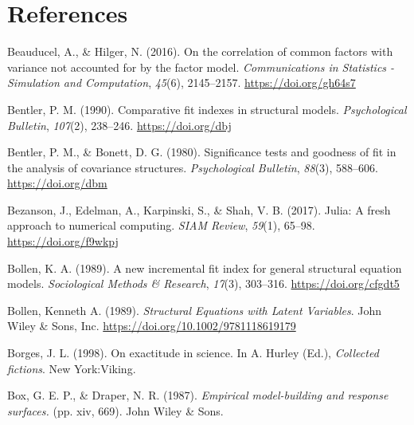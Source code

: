 \documentclass[11pt]{umnthesis}
\newlength{\cslhangindent}
\newenvironment{CSLReferences}[2] %
 {%
  \setlength{\parindent}{0pt}
  \ifodd #1 \everypar{\setlength{\hangindent}{\cslhangindent}}\ignorespaces\fi
  \ifnum #2 > 0
  \setlength{\parskip}{#2\baselineskip}
  \fi
 }%
 {}
\begin{document}
\hypertarget{references}{%
\chapter*{References}\label{references}}

\noindent

\setlength{\parindent}{-0.20in}
\setlength{\leftskip}{0.20in}
\setlength{\parskip}{8pt}

\hypertarget{refs}{}
\begin{CSLReferences}{1}{0}
\leavevmode{}%
Beauducel, A., \& Hilger, N. (2016). On the correlation of common factors with variance not accounted for by the factor model. \emph{Communications in Statistics - Simulation and Computation}, \emph{45}(6), 2145--2157. \url{https://doi.org/gh64s7}

\leavevmode{}%
Bentler, P. M. (1990). Comparative fit indexes in structural models. \emph{Psychological Bulletin}, \emph{107}(2), 238--246. \url{https://doi.org/dbj}

\leavevmode{}%
Bentler, P. M., \& Bonett, D. G. (1980). Significance tests and goodness of fit in the analysis of covariance structures. \emph{Psychological Bulletin}, \emph{88}(3), 588--606. \url{https://doi.org/dbm}

\leavevmode{}%
Bezanson, J., Edelman, A., Karpinski, S., \& Shah, V. B. (2017). Julia: {A} fresh approach to numerical computing. \emph{SIAM Review}, \emph{59}(1), 65--98. \url{https://doi.org/f9wkpj}

\leavevmode{}%
Bollen, K. A. (1989). A new incremental fit index for general structural equation models. \emph{Sociological Methods \& Research}, \emph{17}(3), 303--316. \url{https://doi.org/cfgdt5}

\leavevmode{}%
Bollen, Kenneth A. (1989). \emph{Structural {Equations} with {Latent Variables}}. {John Wiley \& Sons, Inc.} \url{https://doi.org/10.1002/9781118619179}

\leavevmode{}%
Borges, J. L. (1998). On exactitude in science. In A. Hurley (Ed.), \emph{Collected fictions}. {New York:Viking}.

\leavevmode{}%
Box, G. E. P., \& Draper, N. R. (1987). \emph{Empirical model-building and response surfaces.} (pp. xiv, 669). {John Wiley \& Sons}.


\end{CSLReferences}
\end{document}

